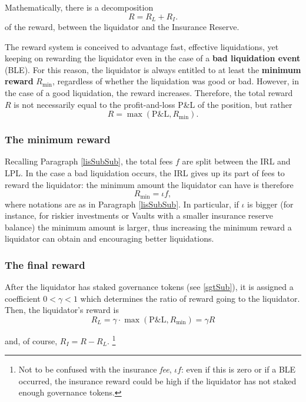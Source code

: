 \documentclass[a4paper,10 pt]{article}
\theoremstyle{definition}
\begin{document}
Mathematically, there is a decomposition $$R = R_L + R_I.$$
of the reward, between the liquidator and the Insurance Reserve.

The reward system is conceived to advantage fast, effective liquidations, yet keeping on rewarding the liquidator even in the case of a {\bf bad liquidation event} (BLE). 
For this reason, the liquidator is always entitled to at least the {\bf minimum reward} $R_{\text{min}}$, regardless of whether the liquidation was good or bad. However, in the case of a good liquidation, the reward increases. Therefore, the total reward $R$ is not necessarily equal to the profit-and-loss P\&L of the position, but rather 
$$R = \max(\text{P\&L}, R_{\text{min}}). $$

\subsubsection{The minimum reward}\label{minrewSubSub}

Recalling Paragraph \ref{lisSubSub}, the total fees $f$ are split between the IRL and LPL. In the case a bad liquidation occurs, the IRL gives up its part of fees to reward the liquidator: the minimum amount the liquidator can have is therefore 
\begin{equation}\label{minreward}
R_{\text{min}} = \iota f,
\end{equation}
where notations are as in Paragraph \ref{lisSubSub}. In particular, if $\iota$ is bigger (for instance, for riskier investments or Vaults with a smaller insurance reserve balance) the minimum amount is larger, thus increasing the minimum reward a liquidator can obtain and encouraging better liquidations.

\subsubsection{The final reward}\label{finrewSubSub}

After the liquidator has staked governance tokens (see \ref{sgtSub}), it is assigned a coefficient $0 < \gamma < 1$ which determines the ratio of reward going to the liquidator. Then, the liquidator's reward is 
\begin{equation}\label{liquidatorreward}
R_L = \gamma\cdot \max(\text{P\&L},R_{\text{min}}) = \gamma  R
\end{equation}

and, of course, $R_I = R - R_L$. \footnote{Not to be confused with the insurance {\it fee}, $\iota f$: even if this is zero or if a BLE occurred, the insurance reward could be high if the liquidator has not staked enough governance tokens.}
\end{document}
